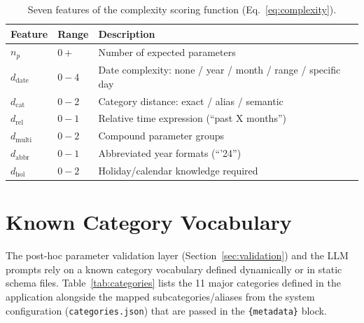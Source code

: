 \documentclass[11pt,twocolumn]{article}
\begin{document}
\begin{table}[h]
\centering
\small
\begin{tabular}{@{}llp{4.5cm}@{}}
\toprule
\textbf{Feature} & \textbf{Range} & \textbf{Description} \\
\midrule
$n_p$              & $0{+}$    & Number of expected parameters \\
$d_{\text{date}}$  & $0{-}4$   & Date complexity: none / year / month / range / specific day \\
$d_{\text{cat}}$   & $0{-}2$   & Category distance: exact / alias / semantic \\
$d_{\text{rel}}$   & $0{-}1$   & Relative time expression (``past X months'') \\
$d_{\text{multi}}$ & $0{-}2$   & Compound parameter groups \\
$d_{\text{abbr}}$  & $0{-}1$   & Abbreviated year formats (``'24'') \\
$d_{\text{hol}}$   & $0{-}2$   & Holiday/calendar knowledge required \\
\bottomrule
\end{tabular}
\caption{Seven features of the complexity scoring function
(Eq.~\ref{eq:complexity}).}
\label{tab:complexity_features}
\end{table}

\section{Known Category Vocabulary}
\label{sec:category_vocabulary}

The post-hoc parameter validation layer (Section~\ref{sec:validation}) and the LLM prompts rely on a known category vocabulary defined dynamically or in static schema files. Table~\ref{tab:categories} lists the 11 major categories defined in the application alongside the mapped subcategories/aliases from the system configuration (\texttt{categories.json}) that are passed in the \texttt{\{metadata\}} block.
\end{document}
